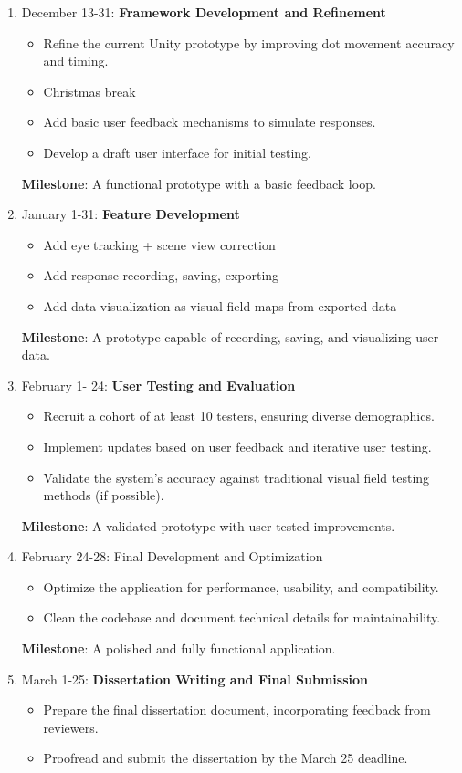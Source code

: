 \documentclass[11pt]{article}
\begin{document}
\begin{enumerate}
    \item December 13-31: \textbf{Framework Development and Refinement}
    \begin{itemize}
        \item Refine the current Unity prototype by improving dot movement accuracy and timing.
        \item Christmas break
        \item Add basic user feedback mechanisms to simulate responses.
        \item Develop a draft user interface for initial testing.
    \end{itemize}
    \textbf{Milestone}: A functional prototype with a basic feedback loop.
    \item January 1-31: \textbf{Feature Development}
    \begin{itemize}
        \item Add eye tracking + scene view correction
        \item Add response recording, saving, exporting
        \item Add data visualization as visual field maps from exported data
    \end{itemize}
    \textbf{Milestone}: A prototype capable of recording, saving, and visualizing user data.
    \item February 1- 24: \textbf{User Testing and Evaluation}
    \begin{itemize}
        \item Recruit a cohort of at least 10 testers, ensuring diverse demographics.
        \item Implement updates based on user feedback and iterative user testing.
        \item Validate the system's accuracy against traditional visual field testing methods (if possible).
    \end{itemize}
    \textbf{Milestone}: A validated prototype with user-tested improvements.
    \item February 24-28: Final Development and Optimization
    \begin{itemize}
        \item Optimize the application for performance, usability, and compatibility.
        \item Clean the codebase and document technical details for maintainability.
    \end{itemize}
    \textbf{Milestone}: A polished and fully functional application.
    \item March 1-25: \textbf{Dissertation Writing and Final Submission}
    \begin{itemize}
        \item Prepare the final dissertation document, incorporating feedback from reviewers.
        \item Proofread and submit the dissertation by the March 25 deadline.
    \end{itemize}
\end{enumerate}

    
    
    
\end{document}
